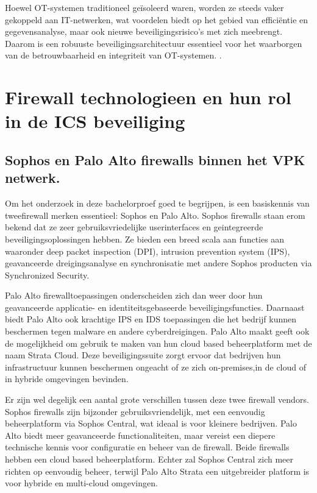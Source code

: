 Hoewel OT-systemen traditioneel geïsoleerd waren, worden ze steeds vaker gekoppeld aan IT-netwerken, wat voordelen biedt op het gebied van efficiëntie en gegevensanalyse, maar ook nieuwe beveiligingsrisico’s met zich meebrengt. Daarom is een robuuste beveiligingsarchitectuur essentieel voor het waarborgen van de betrouwbaarheid en integriteit van OT-systemen. \autocite{Stouffer2023}.

\section{Firewall technologieen en hun rol in de ICS beveiliging}

\subsection{Sophos en Palo Alto firewalls binnen het VPK netwerk.}
Om het onderzoek in deze bachelorproef goed te begrijpen, is een basiskennis van tweefirewall merken essentieel: Sophos en Palo Alto. Sophos firewalls staan erom bekend dat ze zeer gebruiksvriedelijke userinterfaces en geintegreerde beveiligingsoplossingen hebben. Ze bieden een breed scala aan functies aan waaronder deep packet inspection (DPI), intrusion prevention system (IPS), geavanceerde dreigingsanalyse en synchronisatie met andere Sophos producten via Synchronized Security. \autocite{Phipps2024}

Palo Alto firewalltoepassingen onderscheiden zich dan weer door hun geavanceerde applicatie- en identiteitsgebaseerde beveiligingsfuncties. Daarnaast biedt Palo Alto ook krachtige IPS en IDS toepassingen die het bedrijf kunnen beschermen tegen malware en andere cyberdreigingen. Palo Alto maakt geeft ook de mogelijkheid om gebruik te maken van hun cloud based beheerplatform met de naam Strata Cloud. Deze beveiligingssuite zorgt ervoor dat bedrijven hun infrastructuur kunnen beschermen ongeacht of ze zich on-premises,in de cloud of in hybride omgevingen bevinden. \autocite{shread2023}

Er zijn wel degelijk een aantal grote verschillen tussen deze twee firewall vendors. Sophos firewalls zijn bijzonder gebruiksvriendelijk, met een eenvoudig beheerplatform via Sophos Central, wat ideaal is voor kleinere bedrijven. Palo Alto biedt meer geavanceerde functionaliteiten, maar vereist een diepere technische kennis voor configuratie en beheer van de firewall. Beide firewalls hebben een cloud based beheerplatform. Echter zal Sophos Central zich meer richten op eenvoudig beheer, terwijl Palo Alto Strata een uitgebreider platform is voor hybride en multi-cloud omgevingen. \autocite{paloGuard2025} 


